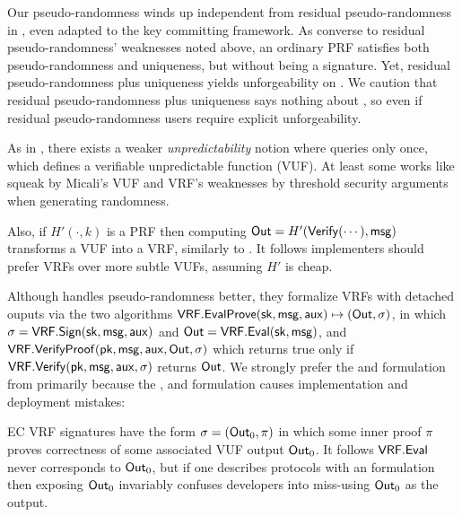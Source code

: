 Our pseudo-randomness winds up independent from residual pseudo-randomness
in \cite{vrf_micali}, even adapted to the key committing framework.
As converse to residual pseudo-randomness' weaknesses noted above,
an ordinary PRF satisfies both pseudo-randomness and uniqueness, but
without being a signature.  Yet, residual pseudo-randomness plus
uniqueness yields unforgeability on \msg.  We caution that
residual pseudo-randomness plus uniqueness says nothing about \aux, so
even if residual pseudo-randomness users require explicit unforgeability.

As in \cite{vrf_micali}, 
there exists a weaker {\em unpredictability} notion where \adv queries
only once, which defines a verifiable unpredictable function (VUF).
%
At least some works like \cite{agg_dkg} squeak by Micali's VUF and VRF's
weaknesses by threshold security arguments when generating randomness.

Also, if $H'(\cdot,k)$ is a PRF then computing ${\mathsf{Out}} = H'({\mathsf{Verify}}(\cdots), \mathsf{msg})$
transforms a VUF into a VRF, similarly to \cite[Proposition 1]{vrf_micali}.
It follows implementers should prefer VRFs over more subtle VUFs, assuming $H'$ is cheap.


\smallskip


Although \cite[\S3.2 $\fvrf$]{praos} handles pseudo-randomness better,
they formalize VRFs with detached ouputs via the two algorithms
${\mathsf{VRF}}.{\mathsf{EvalProve}}(\mathsf{sk},\mathsf{msg},\mathsf{aux}) \mapsto ({\mathsf{Out}},\sigma)$, in which $\sigma = {\mathsf{VRF}}.{\mathsf{Sign}}(\mathsf{sk},\mathsf{msg},\mathsf{aux})$ and ${\mathsf{Out}} = {\mathsf{VRF}}.{\mathsf{Eval}}(\mathsf{sk},\mathsf{msg})$, and
${\mathsf{VRF}}.{\mathsf{VerifyProof}}(\mathsf{pk},\mathsf{msg},\mathsf{aux},{\mathsf{Out}},\sigma)$ which returns true only if ${\mathsf{VRF}}.{\mathsf{Verify}}(\mathsf{pk},\mathsf{msg},\mathsf{aux},\sigma)$ returns ${\mathsf{Out}}$.
We strongly prefer the \Sign and \Verify formulation from \cite{agg_dkg}
primarily because the , and 
formulation causes implementation and deployment mistakes:

EC VRF signatures have the form $\sigma = ({\mathsf{Out}}_0,\pi)$ in which some
inner proof $\pi$ proves correctness of some associated VUF output ${\mathsf{Out}}_0$. %
It follows ${\mathsf{VRF}}.{\mathsf{Eval}}$ never corresponds to ${\mathsf{Out}}_0$, but if one describes
protocols with an  formulation then exposing ${\mathsf{Out}}_0$
invariably confuses developers into miss-using ${\mathsf{Out}}_0$ as the output.

